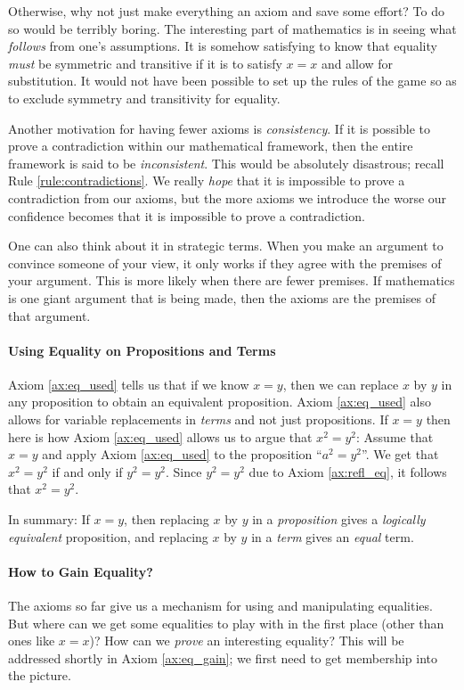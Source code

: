 \documentclass[12pt]{article}
\newcounter{rule}
\begin{document}
Otherwise, why not just make everything an axiom and save some effort?
To do so would be terribly boring.
The interesting part of mathematics is in seeing what \emph{follows} from one's assumptions.
It is somehow satisfying to know that equality \emph{must} be symmetric and transitive
if it is to satisfy $x=x$ and allow for substitution.
It would not have been possible to set up the rules of the game so as to exclude symmetry and transitivity for equality.

Another motivation for having fewer axioms is \emph{consistency}.
If it is possible to prove a contradiction within our mathematical framework, then
the entire framework is said to be \emph{inconsistent}.
This would be absolutely disastrous; recall Rule \ref{rule:contradictions}.
We really \emph{hope} that it is impossible to prove a contradiction from our axioms,
but the more axioms we introduce the worse our confidence becomes that it is impossible to prove a contradiction.

One can also think about it in strategic terms.
When you make an argument to convince someone of your view,
it only works if they agree
with the premises of your argument.
This is more likely when there are fewer premises.
If mathematics is one giant argument that is being made,
then the axioms are the premises of that argument.

\paragraph{Using Equality on Propositions and Terms}
Axiom \ref{ax:eq_used} tells us that if we know $x=y$, then we can replace $x$ by $y$ in any proposition to obtain an
equivalent proposition.
Axiom \ref{ax:eq_used} also allows for variable replacements in \emph{terms} and not just propositions.
If $x=y$ then here is how Axiom \ref{ax:eq_used} allows us to argue that $x^2=y^2$:
Assume that $x=y$ and apply Axiom \ref{ax:eq_used} to the proposition ``$a^2=y^2$''.
We get that $x^2=y^2$ if and only if $y^2=y^2$. Since $y^2=y^2$ due to Axiom \ref{ax:refl_eq},
it follows that $x^2=y^2$.

In summary:
If $x=y$, then replacing $x$ by $y$ in a \emph{proposition} gives a \emph{logically equivalent} proposition,
and replacing $x$ by $y$ in a \emph{term} gives an \emph{equal} term.

\paragraph{How to Gain Equality?}
The axioms so far give us a mechanism for using and manipulating equalities.
But where can we get some equalities to play with in the first place (other than ones like $x=x$)?
How can we \emph{prove} an interesting equality?
This will be addressed shortly in Axiom \ref{ax:eq_gain}; we first need to get membership into the picture.
\end{document}
